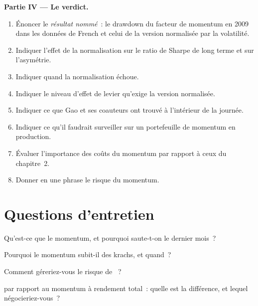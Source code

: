 \begin{problem}
\medskip\noindent\textbf{Partie IV --- Le verdict.}
\begin{enumerate}[resume]
\item Énoncer le \emph{résultat nommé}~: le drawdown du facteur de momentum en 2009 dans les données de French et celui de la version normalisée par la volatilité.
\item Indiquer l'effet de la normalisation sur le ratio de Sharpe de long terme et sur l'asymétrie.
\item Indiquer quand la normalisation échoue.
\item Indiquer le niveau d'effet de levier qu'exige la version normalisée.
\item Indiquer ce que Gao et ses coauteurs ont trouvé à l'intérieur de la journée.
\item Indiquer ce qu'il faudrait surveiller sur un portefeuille de momentum en production.
\item Évaluer l'importance des coûts du momentum par rapport à ceux du chapitre~2.
\item Donner en une phrase le risque du momentum.
\end{enumerate}
\end{problem}

\section{Questions d'entretien}

\begin{interviewq}\label{iq:s1:momentum:1}
Qu'est-ce que le momentum, et pourquoi saute-t-on le dernier mois~?
\end{interviewq}

\begin{interviewq}\label{iq:s1:momentum:2}
Pourquoi le momentum subit-il des krachs, et quand~?
\end{interviewq}

\begin{interviewq}\label{iq:s1:momentum:3}
Comment géreriez-vous le risque de ~?
\end{interviewq}

\begin{interviewq}\label{iq:s1:momentum:4}
 par rapport au momentum à rendement total~: quelle est la différence, et lequel négocieriez-vous~?
\end{interviewq}

